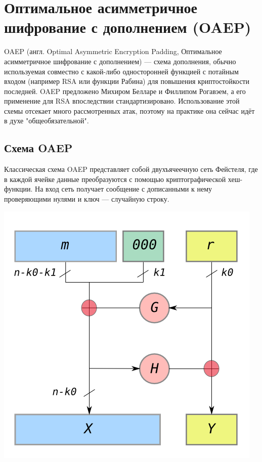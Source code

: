 \documentclass[12pt,a4paper]{scrartcl}
\begin{document}
	
	\section{Оптимальное асимметричное шифрование с дополнением (OAEP)}
	
	OAEP (англ. Optimal Asymmetric Encryption Padding, Оптимальное асимметричное шифрование с дополнением) — схема дополнения, обычно используемая совместно с какой-либо односторонней функцией с потайным входом (например RSA или функции Рабина) для повышения криптостойкости последней. OAEP предложено Михиром Белларе и Филлипом Рогавэем, а его применение для RSA впоследствии стандартизировано. Использование этой схемы отсекает много рассмотренных атак, поэтому на практике она сейчас идёт в духе "общеобязательной".
	
	\subsection{Схема OAEP}
	
	Классическая схема OAEP представляет собой двухъячеечную сеть Фейстеля, где в каждой ячейке данные преобразуются с помощью криптографической хеш-функции. На вход сеть получает сообщение с дописанными к нему проверяющими нулями и ключ — случайную строку.
	
	\includegraphics[scale=0.7]{oaep}
	
\end{document}
